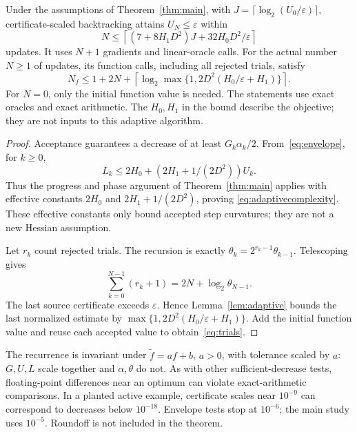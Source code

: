 \begin{theorem}\label{thm:adaptive}
Under the assumptions of Theorem~\ref{thm:main}, with
$J=\lceil\log_2(U_0/\varepsilon)\rceil$, certificate-scaled backtracking
attains $U_N\le\varepsilon$ within
\begin{equation}\label{eq:adaptivecomplexity}
 N\le\left\lceil(7+8H_1D^2)J+32H_0D^2/\varepsilon\right\rceil
\end{equation}
updates. It uses $N+1$ gradients and linear-oracle calls. For the actual
number $N\ge1$ of updates, its function calls, including all rejected
trials, satisfy
\begin{equation}\label{eq:trials}
 N_f\le1+2N+
 \left\lceil\log_2\max\{1,2D^2(H_0/\varepsilon+H_1)\}\right\rceil.
\end{equation}
For $N=0$, only the initial function value is needed. The statements use
exact oracles and exact arithmetic. The $H_0,H_1$ in the bound describe
the objective; they are not inputs to this adaptive algorithm.
\end{theorem}
\begin{proof}
Acceptance guarantees a decrease of at least $G_k\alpha_k/2$.
From~\eqref{eq:envelope}, for $k\ge0$,
\[
 L_k\le2H_0+(2H_1+1/(2D^2))U_k.
\]
Thus the progress and phase argument of Theorem~\ref{thm:main} applies
with effective constants $2H_0$ and $2H_1+1/(2D^2)$, proving
\eqref{eq:adaptivecomplexity}. These effective constants only bound
accepted step curvatures; they are not a new Hessian assumption.

Let $r_k$ count rejected trials. The recursion is exactly
$\theta_k=2^{r_k-1}\theta_{k-1}$. Telescoping gives
\[
 \sum_{k=0}^{N-1}(r_k+1)=2N+\log_2\theta_{N-1}.
\]
The last source certificate exceeds $\varepsilon$. Hence
Lemma~\ref{lem:adaptive} bounds the last normalized estimate by
$\max\{1,2D^2(H_0/\varepsilon+H_1)\}$. Add the initial function value
and reuse each accepted value to obtain~\eqref{eq:trials}.
\end{proof}
The recurrence is invariant under $\widetilde f=af+b$, $a>0$, with
tolerance scaled by $a$: $G,U,L$ scale together and $\alpha,\theta$ do not.
As with other sufficient-decrease tests, floating-point differences near
an optimum can violate exact-arithmetic comparisons. In a planted active
example, certificate scales near $10^{-9}$ can correspond to decreases
below $10^{-18}$. Envelope tests stop at $10^{-6}$; the main study uses
$10^{-5}$. Roundoff is not included in the theorem.


